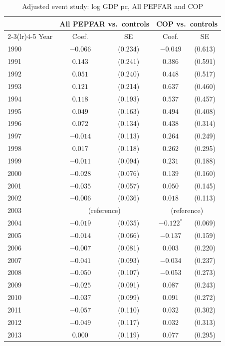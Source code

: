 \begin{table}[htbp]
\centering
\small
\caption{Adjusted event study: log GDP pc, All PEPFAR and COP}
\label{tab:es_combined_log_gdp_pc}
\begin{tabular}{lcccc}
\toprule
 & \multicolumn{2}{c}{All PEPFAR vs.\ controls} & \multicolumn{2}{c}{COP vs.\ controls} \\
\cmidrule(lr){2-3}\cmidrule(lr){4-5}
Year & Coef. & SE & Coef. & SE \\
\midrule
1990 & $-0.066$ & (0.234) & $-0.049$ & (0.613) \\
1991 & $0.143$ & (0.241) & $0.386$ & (0.591) \\
1992 & $0.051$ & (0.240) & $0.448$ & (0.517) \\
1993 & $0.121$ & (0.214) & $0.637$ & (0.460) \\
1994 & $0.118$ & (0.193) & $0.537$ & (0.457) \\
1995 & $0.049$ & (0.163) & $0.494$ & (0.408) \\
1996 & $0.072$ & (0.134) & $0.438$ & (0.314) \\
1997 & $-0.014$ & (0.113) & $0.264$ & (0.249) \\
1998 & $0.017$ & (0.118) & $0.262$ & (0.295) \\
1999 & $-0.011$ & (0.094) & $0.231$ & (0.188) \\
2000 & $-0.028$ & (0.076) & $0.139$ & (0.160) \\
2001 & $-0.035$ & (0.057) & $0.050$ & (0.145) \\
2002 & $-0.006$ & (0.036) & $0.018$ & (0.113) \\
2003 & \multicolumn{2}{c}{(reference)} & \multicolumn{2}{c}{(reference)} \\
2004 & $-0.019$ & (0.035) & $-0.122^{*}$ & (0.069) \\
2005 & $-0.014$ & (0.066) & $-0.137$ & (0.159) \\
2006 & $-0.007$ & (0.081) & $0.003$ & (0.220) \\
2007 & $-0.041$ & (0.093) & $-0.034$ & (0.237) \\
2008 & $-0.050$ & (0.107) & $-0.053$ & (0.273) \\
2009 & $-0.025$ & (0.091) & $0.087$ & (0.243) \\
2010 & $-0.037$ & (0.099) & $0.091$ & (0.272) \\
2011 & $-0.057$ & (0.110) & $0.032$ & (0.302) \\
2012 & $-0.049$ & (0.117) & $0.032$ & (0.313) \\
2013 & $0.000$ & (0.119) & $0.077$ & (0.295) \\

\end{tabular}
\end{table}
